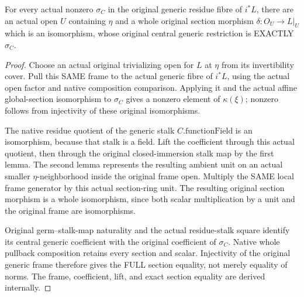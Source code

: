 \begin{theorem}
\label{thm:central-generic-prescribed-section-local-lift}
\leanok
For every actual nonzero $\sigma_C$ in the original generic residue fibre
of $i^*L$, there are an actual open $U$ containing $\eta$ and a whole
original section morphism $\delta:O_U\to L|_U$ which is an isomorphism,
whose original central generic restriction is EXACTLY $\sigma_C$.
\end{theorem}
\begin{proof}
Choose an actual original trivializing open for $L$ at $\eta$ from its
invertibility cover.  Pull this SAME frame to the actual generic fibre
of $i^*L$, using the actual open factor and native composition
comparison.  Applying it and the actual affine global-section
isomorphism to $\sigma_C$ gives a nonzero element of $\kappa(\xi)$;
nonzero follows from injectivity of these original isomorphisms.

The native residue quotient of the generic stalk
$C.\mathrm{functionField}$ is an isomorphism, because that stalk is a
field.  Lift the coefficient through this actual quotient, then through
the original closed-immersion stalk map by the first lemma.  The second
lemma represents the resulting ambient unit on an actual smaller
$\eta$-neighborhood inside the original frame open.  Multiply the SAME
local frame generator by this actual section-ring unit.  The resulting
original section morphism is a whole isomorphism, since both scalar
multiplication by a unit and the original frame are isomorphisms.

Original germ--stalk-map naturality and the actual residue-stalk square
identify its central generic coefficient with the original coefficient
of $\sigma_C$.  Native whole pullback composition retains every section
and scalar.  Injectivity of the original generic frame therefore gives
the FULL section equality, not merely equality of norms.  The frame,
coefficient, lift, and exact section equality are derived internally.
\end{proof}

